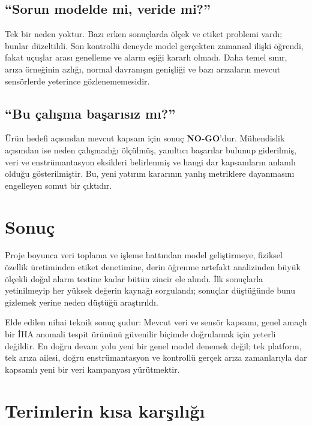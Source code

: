 \documentclass[11pt,a4paper]{article}
\begin{document}
\subsection*{``Sorun modelde mi, veride mi?''}

Tek bir neden yoktur. Bazı erken sonuçlarda ölçek ve etiket problemi vardı;
bunlar düzeltildi. Son kontrollü deneyde model gerçekten zamansal ilişki
öğrendi, fakat uçuşlar arası genelleme ve alarm eşiği kararlı olmadı. Daha temel
sınır, arıza örneğinin azlığı, normal davranışın genişliği ve bazı arızaların
mevcut sensörlerde yeterince gözlenememesidir.

\subsection*{``Bu çalışma başarısız mı?''}

Ürün hedefi açısından mevcut kapsam için sonuç \textbf{NO-GO}'dur. Mühendislik
açısından ise neden çalışmadığı ölçülmüş, yanıltıcı başarılar bulunup giderilmiş,
veri ve enstrümantasyon eksikleri belirlenmiş ve hangi dar kapsamların anlamlı
olduğu gösterilmiştir. Bu, yeni yatırım kararının yanlış metriklere dayanmasını
engelleyen somut bir çıktıdır.

\section{Sonuç}

Proje boyunca veri toplama ve işleme hattından model geliştirmeye, fiziksel
özellik üretiminden etiket denetimine, derin öğrenme artefakt analizinden büyük
ölçekli doğal alarm testine kadar bütün zincir ele alındı. İlk sonuçlarla
yetinilmeyip her yüksek değerin kaynağı sorgulandı; sonuçlar düştüğünde bunu
gizlemek yerine neden düştüğü araştırıldı.

Elde edilen nihai teknik sonuç şudur: Mevcut veri ve sensör kapsamı, genel
amaçlı bir İHA anomali tespit ürününü güvenilir biçimde doğrulamak için yeterli
değildir. En doğru devam yolu yeni bir genel model denemek değil; tek platform,
tek arıza ailesi, doğru enstrümantasyon ve kontrollü gerçek arıza zamanlarıyla
dar kapsamlı yeni bir veri kampanyası yürütmektir.

\appendix

\section{Terimlerin kısa karşılığı}
\end{document}
